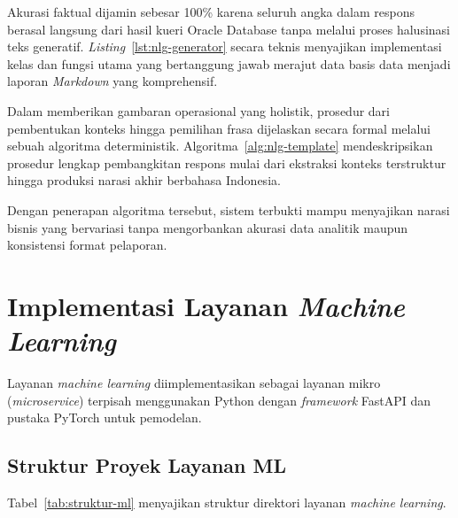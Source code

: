 Akurasi faktual dijamin sebesar 100\% karena seluruh angka dalam respons berasal langsung dari hasil kueri Oracle Database tanpa melalui proses halusinasi teks generatif. \textit{Listing}~\ref{lst:nlg-generator} secara teknis menyajikan implementasi kelas dan fungsi utama yang bertanggung jawab merajut data basis data menjadi laporan \textit{Markdown} yang komprehensif.



Dalam memberikan gambaran operasional yang holistik, prosedur dari pembentukan konteks hingga pemilihan frasa dijelaskan secara formal melalui sebuah algoritma deterministik. Algoritma~\ref{alg:nlg-template} mendeskripsikan prosedur lengkap pembangkitan respons mulai dari ekstraksi konteks terstruktur hingga produksi narasi akhir berbahasa Indonesia.



Dengan penerapan algoritma tersebut, sistem terbukti mampu menyajikan narasi bisnis yang bervariasi tanpa mengorbankan akurasi data analitik maupun konsistensi format pelaporan.

\section{Implementasi Layanan \textit{Machine Learning}}
\label{sec:impl-ml}

Layanan \textit{machine learning} diimplementasikan sebagai layanan mikro (\textit{microservice}) terpisah menggunakan Python dengan \textit{framework} FastAPI dan pustaka PyTorch untuk pemodelan.

\subsection{Struktur Proyek Layanan ML\label{abbr:ML}}

Tabel~\ref{tab:struktur-ml} menyajikan struktur direktori layanan \textit{machine learning}.

